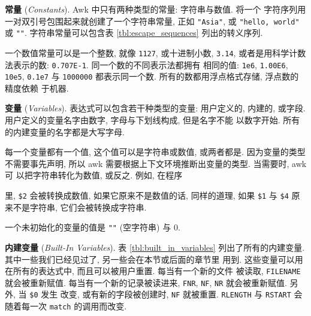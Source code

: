 \textbf{常量} (\emph{Constants}). Awk 中只有两种类型的常量: 字符串与数值.
将一个
字符序列用一对双引号包围起来就创建了一个字符串常量, 正如 \verb'"Asia"',
或 \verb'"hello, world"' 或 \verb'""'. 字符串常量可以包含表
\ref{tbl:escape_sequences} 列出的转义序列.

一个数值常量可以是一个整数, 就像 \verb'1127', 或十进制小数, \verb'3.14',
或者是用科学计数法表示的数: \verb'0.707E-1'. 同一个数的不同表示法都拥有
相同的值: \verb'1e6', \verb'1.00E6', \verb'10e5', \verb'0.1e7' 与
\verb'1000000' 都表示同一个数. 所有的数都用浮点格式存储, 浮点数的精度依赖
于机器.

\textbf{变量} (\emph{Variables}). 表达式可以包含若干种类型的变量: 用户定义的,
内建的, 或字段. 用户定义的变量名字由数字, 字母与下划线构成, 但是名字不能
以数字开始. 所有的内建变量的名字都是大写字母.

每一个变量都有一个值, 这个值可以是字符串或数值, 或两者都是. 因为变量的类型
不需要事先声明, 所以 awk 需要根据上下文环境推断出变量的类型.
当需要时, awk 可
以把字符串转化为数值, 或反之. 例如, 在程序
里, \verb'$2' 会被转换成数值, 如果它原来不是数值的话, 同样的道理, 如果 \verb'$1'
与 \verb'$4' 原来不是字符串, 它们会被转换成字符串.

一个未初始化的变量的值是 \verb'""' (空字符串) 与 0.

\textbf{内建变量} (\emph{Built-In Variables}). 表 \ref{tbl:built_in_variables}
列出了所有的内建变量. 其中一些我们已经见过了, 另一些会在本节或后面的章节里
用到. 这些变量可以用在所有的表达式中, 而且可以被用户重置. 每当有一个新的文件
被读取, \verb'FILENAME' 就会被重新赋值. 每当有一个新的记录被读进来,
\verb'FNR', \verb'NF', \verb'NR' 就会被重新赋值. 另外, 当 \verb'$0' 发生
改变, 或有新的字段被创建时, \verb'NF' 就被重置. \verb'RLENGTH' 与
\verb'RSTART' 会随着每一次 \verb'match' 的调用而改变.

